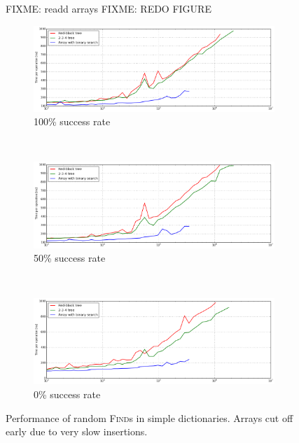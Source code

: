 \begin{figure}
FIXME: readd arrays
FIXME: REDO FIGURE
\begin{subfigure}[t]{\textwidth}
	\includegraphics[width=\textwidth]{img/performance/basic-random-find-100}
	\caption{100\% success rate}
\end{subfigure}
\\
\begin{subfigure}[t]{\textwidth}
	\includegraphics[width=\textwidth]{img/performance/basic-random-find-50}
	\caption{50\% success rate}
\end{subfigure}
\\
\begin{subfigure}[t]{\textwidth}
	\includegraphics[width=\textwidth]{img/performance/basic-random-find-0}
	\caption{0\% success rate}
\end{subfigure}
\caption{Performance of random \textsc{Find}s in simple dictionaries.
	Arrays cut off early due to very slow insertions.}
\label{fig:basic-finds}
\end{figure}

